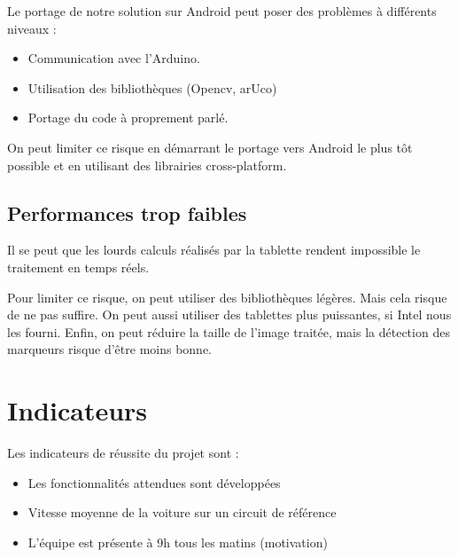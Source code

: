 \documentclass[a4paper,12pt]{article}
\begin{document}
Le portage de notre solution sur Android peut poser des problèmes à différents
niveaux :
\begin{itemize}
    \item Communication avec l'Arduino.
    \item Utilisation des bibliothèques (Opencv, arUco)
    \item Portage du code à proprement parlé.
\end{itemize}

On peut limiter ce risque en démarrant le portage vers Android le plus tôt
possible et en utilisant des librairies cross-platform.

\subsection{Performances trop faibles}

Il se peut que les lourds calculs réalisés par la tablette rendent impossible
le traitement en temps réels.

Pour limiter ce risque, on peut utiliser des bibliothèques légères. Mais cela
risque de ne pas suffire.
On peut aussi utiliser des tablettes plus puissantes, si Intel nous les fourni.
Enfin, on peut réduire la taille de l'image traitée, mais la détection des
marqueurs risque d'être moins bonne.


\section{Indicateurs}

Les indicateurs de réussite du projet sont :
\begin{itemize}
    \item Les fonctionnalités attendues sont développées
    \item Vitesse moyenne de la voiture sur un circuit de référence
    \item L'équipe est présente à 9h tous les matins (motivation)
\end{itemize}
\end{document}
